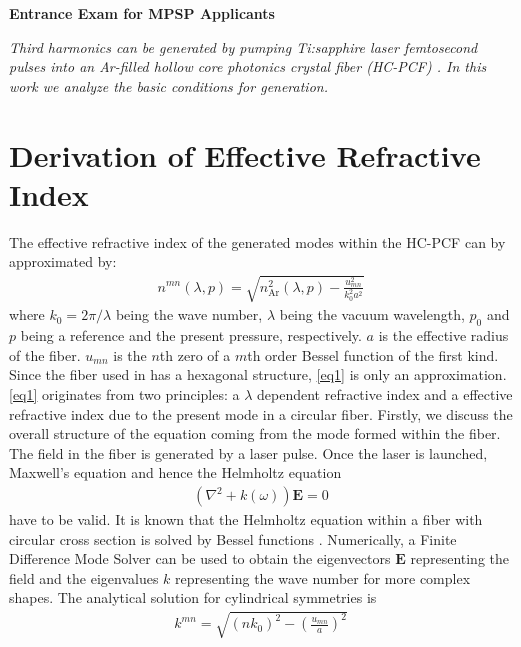 \documentclass[fleqn, 10pt, twocolumn]{SelfArx}
\begin{document}
%
\begin{center}
\colorbox{color2!10}{\large{}\textcolor{color1}{\sffamily\bfseries Entrance Exam for MPSP Applicants}}
\end{center}
    \textit{Third harmonics can be generated by pumping Ti:sapphire laser femtosecond pulses into an Ar-filled hollow core photonics crystal fiber (HC-PCF) \cite{Nold2010}. In this
    work we analyze the basic conditions for generation.}

    \section{Derivation of Effective Refractive Index}
    The effective refractive index of the generated modes within the HC-PCF can by approximated by:
    \begin{align}
        n^{mn}(\lambda, p) = \sqrt{n^2_{\text{Ar}}(\lambda, p ) - \frac{u_{mn}^2}{k_0^2 a^2}} 
        \label{eq1}
    \end{align}
    where $k_0=2\pi/\lambda$ being the wave number, $\lambda$ being the vacuum wavelength, $p_0$ and $p$ being a reference and the present pressure, respectively. $a$ is the 
    effective radius of the fiber. $u_{mn}$ is the $n$th zero of a $m$th order Bessel function of the first kind. Since the fiber used in \cite{Nold2010} has a hexagonal structure, \eqref{eq1} is only an approximation.
    \eqref{eq1} originates from two principles: a $\lambda$ dependent refractive index and a effective refractive index due to the present mode in a circular fiber.
    Firstly, we discuss the overall structure of the equation coming from the mode formed within the fiber. The field in the fiber is generated by a laser pulse. Once the laser is launched, Maxwell's equation and hence the Helmholtz equation 
    \begin{align}
        \left(\nabla^2 + k(\omega)\right) \mathbf E = 0
        \label{eq:helmholtz}
    \end{align}
    have to be valid.
    It is known that the Helmholtz equation within a fiber with circular cross section is solved by Bessel functions \cite{Nickelson2019}. 
    Numerically, a Finite Difference Mode Solver can be used to obtain the eigenvectors $\mathbf E$ representing the field and the eigenvalues $k$ representing the wave number for more complex shapes. The analytical solution for cylindrical symmetries is 
    \begin{align}
        k^{mn} = \sqrt{(n k_0)^2 - \left( \frac{u_{mn}}{a}\right)^2}
    \end{align}
\end{document}
